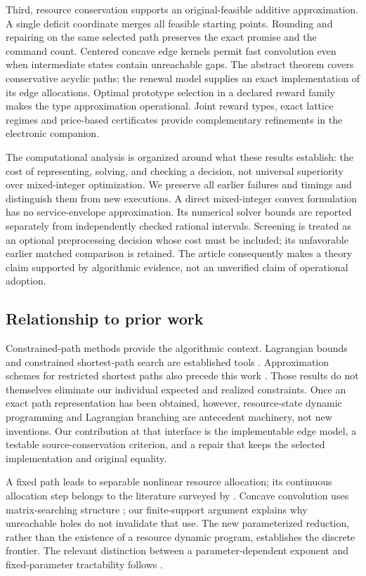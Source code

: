 Third, resource conservation supports an original-feasible additive approximation. A single deficit coordinate merges all feasible starting points. Rounding and repairing on the same selected path preserves the exact promise and the command count. Centered concave edge kernels permit fast convolution even when intermediate states contain unreachable gaps. The abstract theorem covers conservative acyclic paths; the renewal model supplies an exact implementation of its edge allocations. Optimal prototype selection in a declared reward family makes the type approximation operational. Joint reward types, exact lattice regimes and price-based certificates provide complementary refinements in the electronic companion.

The computational analysis is organized around what these results establish: the cost of representing, solving, and checking a decision, not universal superiority over mixed-integer optimization. We preserve all earlier failures and timings and distinguish them from new executions. A direct mixed-integer convex formulation has no service-envelope approximation. Its numerical solver bounds are reported separately from independently checked rational intervals. Screening is treated as an optional preprocessing decision whose cost must be included; its unfavorable earlier matched comparison is retained. The article consequently makes a theory claim supported by algorithmic evidence, not an unverified claim of operational adoption.

\subsection{Relationship to prior work}
Constrained-path methods provide the algorithmic context. Lagrangian bounds and constrained shortest-path search are established tools \citep{HandlerZang1980,BeasleyChristofides1989,Fisher1981}. Approximation schemes for restricted shortest paths also precede this work \citep{Hassin1992,LorenzRaz2001}. Those results do not themselves eliminate our individual expected and realized constraints. Once an exact path representation has been obtained, however, resource-state dynamic programming and Lagrangian branching are antecedent machinery, not new inventions. Our contribution at that interface is the implementable edge model, a testable source-conservation criterion, and a repair that keeps the selected implementation and original equality.

A fixed path leads to separable nonlinear resource allocation; its continuous allocation step belongs to the literature surveyed by \citet{Patriksson2008}. Concave convolution uses matrix-searching structure \citep{Aggarwal1987}; our finite-support argument explains why unreachable holes do not invalidate that use. The new parameterized reduction, rather than the existence of a resource dynamic program, establishes the discrete frontier. The relevant distinction between a parameter-dependent exponent and fixed-parameter tractability follows \citet{DowneyFellows1995b}.

